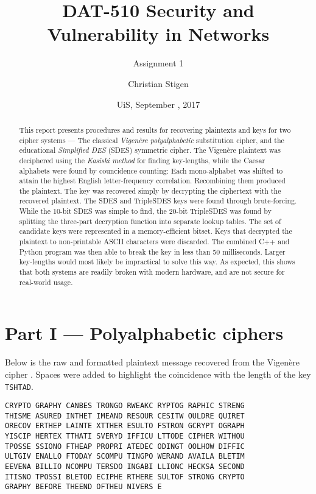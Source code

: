 \documentclass[a4paper,english,12pt]{article}
\title{DAT-510 Security and Vulnerability in Networks}
\subtitle{Assignment 1}
\author{Christian Stigen}
\date{UiS, September \nth{18}, 2017}
\begin{document}
\maketitle


\begin{abstract}
  This report presents procedures and results for recovering plaintexts and keys
  for two cipher systems --- The classical \textit{Vigenère polyalphabetic}
  substitution cipher, and the educational \textit{Simplified DES} (SDES) symmetric cipher.
%
  The Vigenère plaintext was deciphered using the \textit{Kasiski method} for
  finding key-lengths, while the Caesar alphabets were found by
  councidence counting: Each mono-alphabet was shifted to attain the highest
  English letter-frequency correlation. Recombining them produced the
  plaintext. The key was recovered simply by decrypting the ciphertext with the
  recovered plaintext.
%
  The SDES and TripleSDES keys were found through brute-forcing. While the
  10-bit SDES was simple to find, the 20-bit TripleSDES was found by splitting
  the three-part decryption function into separate lookup tables. The set of
  candidate keys were represented in a memory-efficient bitset. Keys that
  decrypted the plaintext to non-printable ASCII characters were discarded.
  The combined C++ and Python program was then able to break the key in less
  than 50 milliseconds.  Larger key-lengths would most likely be impractical to
  solve this way.
%
  As expected, this shows that both systems are readily broken with modern
  hardware, and are not secure for real-world usage.
\end{abstract}

\section{Part I --- Polyalphabetic ciphers}

Below is the raw and formatted plaintext message recovered from the Vigenère
cipher \cite{wiki:vigenere, wiki:polyalphabetic}. Spaces were added to highlight
the coincidence with the length of the key \texttt{TSHTAD}.

\begin{verbatim}
CRYPTO GRAPHY CANBES TRONGO RWEAKC RYPTOG RAPHIC STRENG
THISME ASURED INTHET IMEAND RESOUR CESITW OULDRE QUIRET
ORECOV ERTHEP LAINTE XTTHER ESULTO FSTRON GCRYPT OGRAPH
YISCIP HERTEX TTHATI SVERYD IFFICU LTTODE CIPHER WITHOU
TPOSSE SSIONO FTHEAP PROPRI ATEDEC ODINGT OOLHOW DIFFIC
ULTGIV ENALLO FTODAY SCOMPU TINGPO WERAND AVAILA BLETIM
EEVENA BILLIO NCOMPU TERSDO INGABI LLIONC HECKSA SECOND
ITISNO TPOSSI BLETOD ECIPHE RTHERE SULTOF STRONG CRYPTO
GRAPHY BEFORE THEEND OFTHEU NIVERS E
\end{verbatim}
\end{document}
